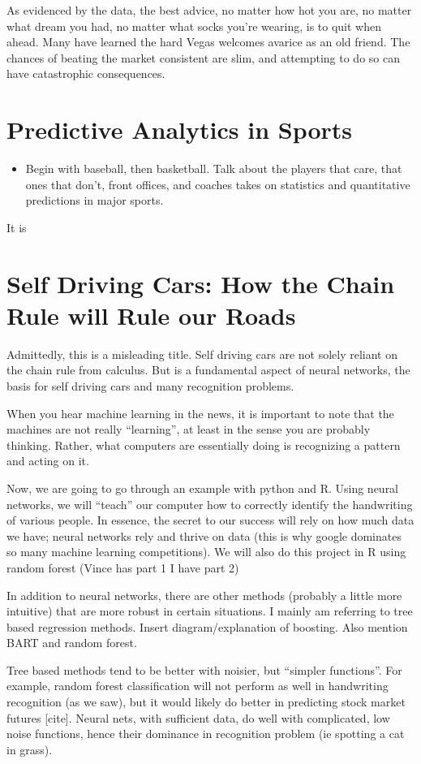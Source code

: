 \documentclass[12pt,twoside]{book}
\begin{document}
 As evidenced by the data, the best advice, no matter how hot you are, no matter what dream you had, no matter what socks you're wearing, is to quit when ahead.  Many have learned the hard Vegas welcomes avarice as an old friend. The chances of beating the market consistent are slim, and attempting to do so can have catastrophic consequences. 
	\chapter{Predictive Analytics in Sports}
	\begin{itemize}
		\item Begin with baseball, then basketball.  Talk about the players that care, that ones that don't, front offices, and coaches takes on statistics and quantitative predictions in major sports.
	\end{itemize}
	It is 
		\chapter[``Machine Learning'']{Self Driving Cars:  How the Chain Rule will Rule our Roads}
		
		Admittedly, this is a misleading title.  Self driving cars are not solely reliant on the chain rule from calculus.  But is a fundamental aspect of neural networks, the basis for self driving cars and many recognition problems.  
		
		
		When you hear machine learning in the news, it is important to note that the machines are not really ``learning'', at least in the sense you are probably thinking.  Rather, what computers are essentially doing is recognizing a pattern and acting on it.  
		
		Now, we are going to go through an example with python and R.  Using neural networks, we will ``teach'' our computer how to correctly identify the handwriting of various people.  In essence, the secret to our success will rely on how much data we have; neural networks rely and thrive on data  (this is why google dominates so many machine learning competitions).  We will also do this project in R using random forest (Vince has part 1 I have part 2)
		
		In addition to neural networks, there are other methods (probably a little more intuitive) that are more robust in certain situations.  I mainly am referring to tree based regression methods.  Insert diagram/explanation of boosting.  Also mention BART and random forest.  
		
		Tree based methods tend to be better with noisier, but ``simpler functions''.  For example, random forest classification will not perform as well in handwriting recognition (as we saw), but it would likely do better in predicting stock market futures [cite].  Neural nets, with sufficient data, do well with complicated, low noise functions, hence their dominance in recognition problem (ie spotting a cat in grass).  
\end{document}
